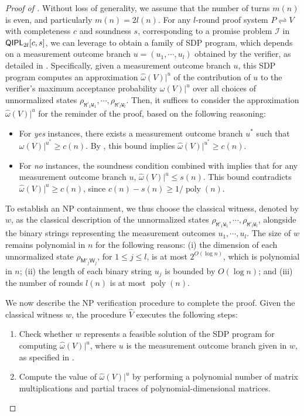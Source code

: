 \documentclass[11pt, a4paper]{article}
\numberwithin{equation}{section}
\numberwithin{figure}{section}
\newcommand{\NP}{\textnormal{\textsf{NP}}\xspace}
\newcommand{\QIPL}{\textnormal{\textsf{QIPL}}\xspace}
\newcommand{\protocol}[2]{{#1}\!\rightleftharpoons\!{#2}}
\DeclareMathOperator\poly{poly}
\newcommand{\calI}{\mathcal{I}}
\newcommand{\sfM}{\mathsf{M}}
\newcommand{\sfW}{\mathsf{W}}
\newcommand{\ttM}{\mathtt{M}}
\newcommand{\ttW}{\mathtt{W}}
\newcommand{\hatV}{\widehat{V}}
\begin{document}
\begin{proof}[Proof of ]
    Without loss of generality, we assume that the number of turns $m(n)$ is even, and particularly $m(n) = 2l(n)$. 
    For any $l$-round proof system $\protocol{P}{V}$ with completeness $c$ and soundness $s$, corresponding to a promise problem $\calI$ in $\QIPL_{2l}[c,s]$, we can leverage  to obtain a family of SDP program, which depends on a measurement outcome branch $u=(u_1,\cdots,u_l)$ obtained by the verifier, as detailed in . Specifically, given a measurement outcome branch $u$, this SDP program computes an approximation $\widehat{\omega}(V)|^u$ of the contribution of $u$ to the verifier's maximum acceptance probability $\omega(V)|^u$ over all choices of unnormalized states $\rho_{\ttM'_1\ttW_1}, \cdots, \rho_{\ttM'_l\ttW_l}$. 
    Then, it suffices to consider the approximation $\widehat{\omega}(V)|^u$ for the reminder of the proof, based on the following reasoning:
    \begin{itemize}
        \item For \textit{yes} instances, there exists a measurement outcome branch $u^*$ such that $\omega(V)|^{u^*} \geq c(n)$. By , this bound implies $\widehat{\omega}(V)|^{u^*} \geq c(n)$. 
        \item For \textit{no} instances, the soundness condition combined with  implies that for any measurement outcome branch $u$, $\widehat{\omega}(V)|^u \leq s(n)$. This bound contradicts $\widehat{\omega}(V)|^u \geq c(n)$, since $c(n)-s(n) \geq 1/\poly(n)$. 
    \end{itemize}

    To establish an \NP{} containment, we thus choose the classical witness, denoted by $w$, as the classical description of the unnormalized states $\rho_{\ttM'_1\ttW_1}, \cdots, \rho_{\ttM'_l\ttW_l}$, alongside the binary strings representing the measurement outcomes $u_1,\cdots,u_l$. The size of $w$ remains polynomial in $n$ for the following reasons: (i) the dimension of each unnormalized state $\rho_{\sfM'_j\sfW_j}$, for $1 \leq j \leq l$, is at most $2^{O(\log n)}$, which is polynomial in $n$; (ii) the length of each binary string $u_j$ is bounded by $O(\log n)$; and (iii) the number of rounds $l(n)$ is at most $\poly(n)$. 

    We now describe the \NP{} verification procedure to complete the proof. Given the classical witness $w$, the procedure $\hatV$ executes the following steps:
    \begin{enumerate}[label={\upshape(\arabic*)}, topsep=0.33em, itemsep=0.33em, parsep=0.33em] 
        \item Check whether $w$ represents a feasible solution of the SDP program for computing $\widehat{\omega}(V)|^u$, where $u$ is the measurement outcome branch given in $w$, as specified in . 
        \item Compute the value of $\widehat{\omega}(V)|^u$ by performing a polynomial number of matrix multiplications and partial traces of polynomial-dimensional matrices. 
    \end{enumerate}
    

\end{proof}
\end{document}
